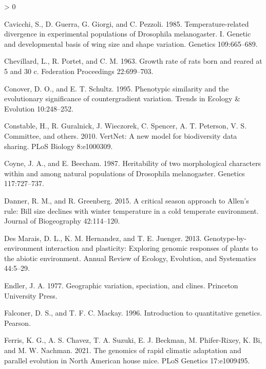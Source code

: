 \documentclass[
]{article}
\newlength{\cslhangindent}
\newenvironment{CSLReferences}[2] %
 {%
  \setlength{\parindent}{0pt}
  \ifodd #1 \everypar{\setlength{\hangindent}{\cslhangindent}}\ignorespaces\fi
  \ifnum #2 > 0
  \setlength{\parskip}{#2\baselineskip}
  \fi
 }%
 {}
\begin{document}
\begin{CSLReferences}{0}{0}
\leavevmode\hypertarget{ref-Cavicchi1985}{}%
Cavicchi, S., D. Guerra, G. Giorgi, and C. Pezzoli. 1985.
Temperature-related divergence in experimental populations of
{Drosophila} melanogaster. I. Genetic and developmental basis of wing
size and shape variation. Genetics 109:665--689.

\leavevmode\hypertarget{ref-Chevillard1963}{}%
Chevillard, L., R. Portet, and C. M. 1963. Growth rate of rats born and
reared at 5 and 30 c. Federation Proceedings 22:699--703.

\leavevmode\hypertarget{ref-Conover1995}{}%
Conover, D. O., and E. T. Schultz. 1995. Phenotypic similarity and the
evolutionary significance of countergradient variation. Trends in
Ecology \& Evolution 10:248--252.

\leavevmode\hypertarget{ref-Constable2010}{}%
Constable, H., R. Guralnick, J. Wieczorek, C. Spencer, A. T. Peterson,
V. S. Committee, and others. 2010. VertNet: A new model for biodiversity
data sharing. PLoS Biology 8:e1000309.

\leavevmode\hypertarget{ref-Coyne1987}{}%
Coyne, J. A., and E. Beecham. 1987. Heritability of two morphological
characters within and among natural populations of {Drosophila}
melanogaster. Genetics 117:727--737.

\leavevmode\hypertarget{ref-Danner2015}{}%
Danner, R. M., and R. Greenberg. 2015. A critical season approach to
{Allen's} rule: Bill size declines with winter temperature in a cold
temperate environment. Journal of Biogeography 42:114--120.

\leavevmode\hypertarget{ref-DesMarais2013}{}%
Des Marais, D. L., K. M. Hernandez, and T. E. Juenger. 2013.
Genotype-by-environment interaction and plasticity: Exploring genomic
responses of plants to the abiotic environment. Annual Review of
Ecology, Evolution, and Systematics 44:5--29.

\leavevmode\hypertarget{ref-Endler1977}{}%
Endler, J. A. 1977. Geographic variation, speciation, and clines.
Princeton University Press.

\leavevmode\hypertarget{ref-Falconer1996}{}%
Falconer, D. S., and T. F. C. Mackay. 1996. Introduction to quantitative
genetics. Pearson.

\leavevmode\hypertarget{ref-Ferris2021}{}%
Ferris, K. G., A. S. Chavez, T. A. Suzuki, E. J. Beckman, M.
Phifer-Rixey, K. Bi, and M. W. Nachman. 2021. The genomics of rapid
climatic adaptation and parallel evolution in {North} {American} house
mice. PLoS Genetics 17:e1009495.


\end{CSLReferences}
\end{document}
